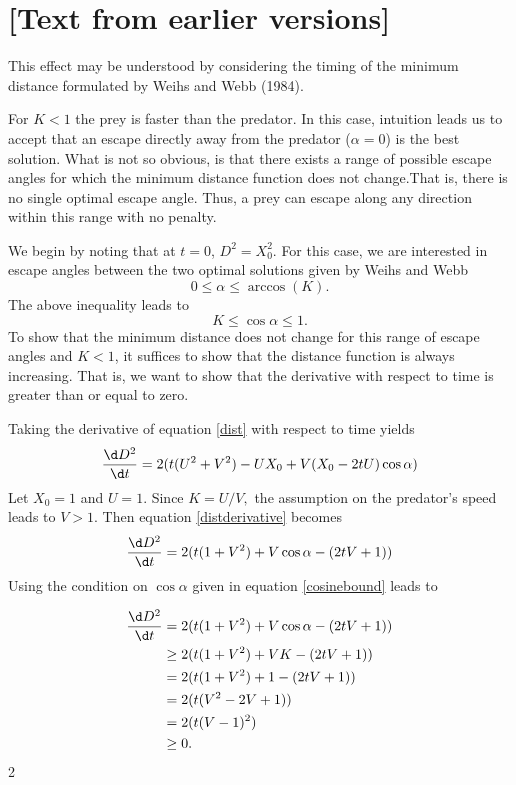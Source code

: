 \section{[Text from earlier versions]}


This effect may be understood by considering the timing of the minimum distance formulated by Weihs and Webb (1984). 

For $K<1$ the prey is faster than the predator. In this case, intuition leads us to accept that an escape directly away from the predator ($\alpha =0$) is the best solution. What is not so obvious, is that there exists a range of possible escape angles for which the minimum distance function does not change.That is, there is no single optimal escape angle. Thus, a prey can escape along any direction within this range with no penalty.

We begin by noting that at $t=0$, $D^2 = X_0^2.$ For this case, we are interested in escape angles between the two optimal solutions given by Weihs and Webb
%
\begin{equation}
0 \leq \alpha \leq \arccos(K).
\label{anglerange}
\end{equation}
The above inequality leads to 
\begin{equation}
K \leq \cos\alpha \leq 1.
\label{cosinebound}
\end{equation}      
%
To show that the minimum distance does not change for this range of escape angles and $K<1$, it suffices to show that the distance function is always increasing. That is, we want to show that the derivative with respect to time is greater than or equal to zero. 

Taking the derivative of equation \eqref{dist} with respect to time yields
%
\begin{equation}
\frac{\d D^2}{\d t}  = 2(t(U^2+V^2) - UX_0 + V(X_0-2tU)\cos\alpha)
\label{distderivative}
\end{equation}  
%
Let $X_0=1$ and $U=1$. Since $K = U/V,$ the assumption on the predator's speed leads to $V > 1.$ 
Then equation \eqref{distderivative} becomes
%
\begin{equation}
\frac{\d D^2}{\d t}  = 2(t(1+V^2) +V\cos\alpha - (2tV + 1))
\label{distderivative2}
\end{equation}
%
Using the condition on $\cos\alpha$ given in equation \eqref{cosinebound} leads to

\begin{align*}
\frac{\d D^2}{\d t}  & = 2(t(1+V^2) +V\cos\alpha - (2tV + 1)) \\
& \geq 2(t(1+V^2) +VK - (2tV + 1)) \\
& = 2(t(1+V^2) +1 - (2tV + 1)) \\
& = 2(t(V^2- 2V + 1)) \\
& =2(t(V-1)^2)\\
& \geq 0.
\end{align*}2

